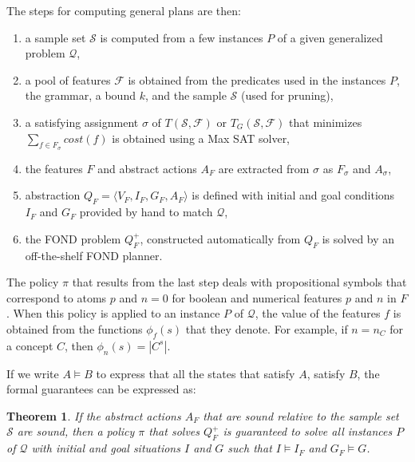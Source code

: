 \documentclass[letterpaper]{article} %
\newcommand{\tup}[1]{\langle #1 \rangle}
\newtheorem{theorem}[definition]{Theorem}
\newcommand{\Q}{\mathcal{Q}}
\newcommand{\F}{\mathcal{F}}
\renewcommand{\S}{\mathcal{S}}
\begin{document}
The steps for computing general plans are then:
\begin{enumerate}[1.]
  \item a sample set $\S$ is computed from a few instances $P$ of a given
    generalized problem $\Q$,
  \item a pool of features $\F$ is obtained from the predicates used in the
    instances $P$, the grammar, a  bound $k$, and the sample $\S$ (used for
    pruning),
  \item a satisfying assignment $\sigma$ of $T(\S,\F)$ or $T_G(\S,\F)$
    that minimizes $\sum_{f \in F_{\sigma}} cost(f)$ is obtained using a
    Max SAT solver,
  \item the features $F$ and abstract actions $A_F$ are extracted from $\sigma$
    as $F_{\sigma}$ and $A_{\sigma}$,
  \item abstraction $Q_F=\tup{V_F,I_F,G_F,A_F}$ is defined with initial and goal
    conditions $I_F$ and $G_F$ provided by hand to match $\Q$, 
  \item the FOND problem $Q^+_F$, constructed automatically from $Q_F$ is solved by an off-the-shelf
    FOND planner.
\end{enumerate}

The policy $\pi$ that results from the last step deals with propositional symbols that correspond to atoms $p$ and $n=0$ for boolean
and numerical features $p$ and $n$ in $F$. When this policy is applied to an instance $P$ of $\Q$, the  value of the features $f$
is obtained from the functions $\phi_f(s)$ that they denote. For example, if $n=n_C$ for a concept $C$, then $\phi_{n}(s)=|C^s|$.

If we write $A \vDash B$ to express that all the states that satisfy $A$, satisfy $B$, 
the formal guarantees can be expressed as:

\begin{theorem}
If the abstract actions $A_F$ that are sound relative to the sample set $\S$  are  sound,
then a   policy $\pi$ that solves  $Q^+_F$  is guaranteed to solve  all instances $P$ of $\Q$
with initial and goal situations $I$ and $G$ such that $I \vDash  I_F$ and $G_F \vDash G$.
\end{theorem}

\end{document}
